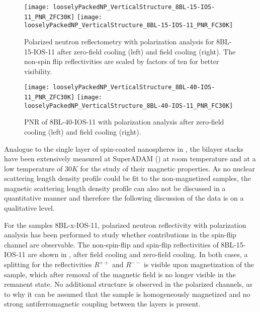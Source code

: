 \documentclass[\main/dresen_thesis.tex]{subfiles}
\begin{document}
  \label{sec:looselyPackedNS:bilayerStacks:pnr}

  \begin{figure}[tb]
    \centering
    \texttt{[image: looselyPackedNP\_VerticalStructure\_8BL-15-IOS-11\_PNR\_ZFC30K]}
    \texttt{[image: looselyPackedNP\_VerticalStructure\_8BL-15-IOS-11\_PNR\_FC30K]}
    \caption{\label{fig:looselyPackedNP:bilayer:pnr:8BL-15-IOS11}Polarized neutron reflectometry with polarization analysis for 8BL-15-IOS-11 after zero-field cooling (left) and field cooling (right). The non-spin flip reflectivities are scaled by factors of ten for better visibility. }
  \end{figure}

  \begin{figure}[tb]
    \centering
    \texttt{[image: looselyPackedNP\_VerticalStructure\_8BL-40-IOS-11\_PNR\_ZFC30K]}
    \texttt{[image: looselyPackedNP\_VerticalStructure\_8BL-40-IOS-11\_PNR\_FC30K]}
    \caption{\label{fig:looselyPackedNP:bilayer:pnr:8BL-40-IOS11}PNR of 8BL-40-IOS-11 with polarization analysis after zero-field cooling (left) and field cooling (right).}
  \end{figure}

  Analogue to the single layer of spin-coated nanospheres in , the bilayer stacks have been extensively measured at SuperADAM () at room temperature and at a low temperature of $30 \unit{K}$ for the study of their magnetic properties.
  As no nuclear scattering length density profile could be fit to the non-magnetized samples, the magnetic scattering length density profile can also not be discussed in a quantitative manner and therefore the following discussion of the data is on a qualitative level.

  For the samples 8BL-x-IOS-11, polarized neutron reflectivity with polarization analysis has been performed to study whether contributions in the spin-flip channel are observable.
  The non-spin-flip and spin-flip reflectivities of 8BL-15-IOS-11 are shown in , after field cooling and zero-field cooling.
  In both cases, a splitting for the reflectivities $R^{++}$ and $R^{--}$ is visible upon magnetization of the sample, which after removal of the magnetic field is no longer visible in the remanent state.
  No additional structure is observed in the polarized channels, as to why it can be assumed that the sample is homogeneously magnetized and no strong antiferromagnetic coupling between the layers is present.
\end{document}
